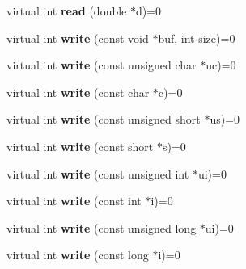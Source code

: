 \begin{DoxyCompactItemize}
\item 
virtual int {\bfseries read} (double $\ast$d)=0\hypertarget{class_magnum_1_1_i_o_a0840e51a406ffa4814eb4f71afd62729}{}\label{class_magnum_1_1_i_o_a0840e51a406ffa4814eb4f71afd62729}

\item 
virtual int {\bfseries write} (const void $\ast$buf, int size)=0\hypertarget{class_magnum_1_1_i_o_a854f43abfd629eca53f7058148ff0d77}{}\label{class_magnum_1_1_i_o_a854f43abfd629eca53f7058148ff0d77}

\item 
virtual int {\bfseries write} (const unsigned char $\ast$uc)=0\hypertarget{class_magnum_1_1_i_o_a0761fa4b4f5a318f4b42708af9dc7800}{}\label{class_magnum_1_1_i_o_a0761fa4b4f5a318f4b42708af9dc7800}

\item 
virtual int {\bfseries write} (const char $\ast$c)=0\hypertarget{class_magnum_1_1_i_o_a12911b88d8a8b854f9493aa9446ca6e4}{}\label{class_magnum_1_1_i_o_a12911b88d8a8b854f9493aa9446ca6e4}

\item 
virtual int {\bfseries write} (const unsigned short $\ast$us)=0\hypertarget{class_magnum_1_1_i_o_af8ce88266414865aea8e295068b3f13c}{}\label{class_magnum_1_1_i_o_af8ce88266414865aea8e295068b3f13c}

\item 
virtual int {\bfseries write} (const short $\ast$s)=0\hypertarget{class_magnum_1_1_i_o_a843adf1f8641cc0e3af5eaa035727112}{}\label{class_magnum_1_1_i_o_a843adf1f8641cc0e3af5eaa035727112}

\item 
virtual int {\bfseries write} (const unsigned int $\ast$ui)=0\hypertarget{class_magnum_1_1_i_o_ad1658d390bedd8b6139d05af9293bb3c}{}\label{class_magnum_1_1_i_o_ad1658d390bedd8b6139d05af9293bb3c}

\item 
virtual int {\bfseries write} (const int $\ast$i)=0\hypertarget{class_magnum_1_1_i_o_af90bf14dbc9fec9c892bb0a0958ce75b}{}\label{class_magnum_1_1_i_o_af90bf14dbc9fec9c892bb0a0958ce75b}

\item 
virtual int {\bfseries write} (const unsigned long $\ast$ui)=0\hypertarget{class_magnum_1_1_i_o_a9cfe3c38a801698a77d7f6ce49ea982e}{}\label{class_magnum_1_1_i_o_a9cfe3c38a801698a77d7f6ce49ea982e}

\item 
virtual int {\bfseries write} (const long $\ast$i)=0\hypertarget{class_magnum_1_1_i_o_af64debf74ad448177a213fcde8eb5b58}{}\label{class_magnum_1_1_i_o_af64debf74ad448177a213fcde8eb5b58}


\end{DoxyCompactItemize}
